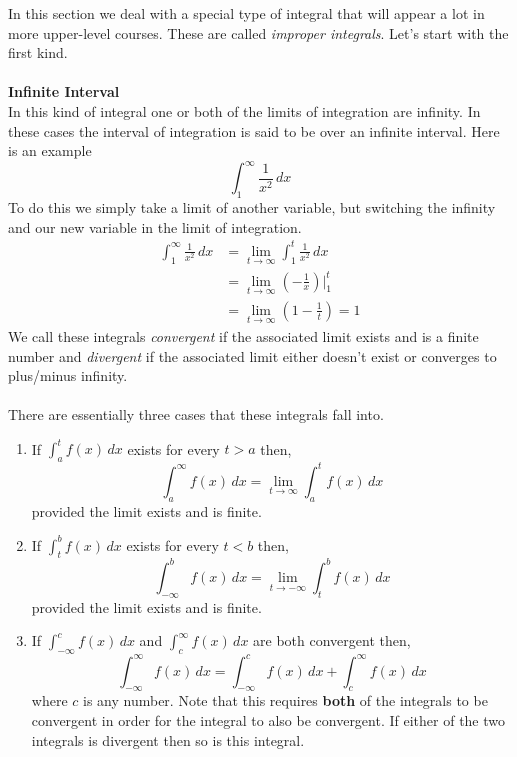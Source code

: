 \documentclass[10pt,reqno]{book}
\theoremstyle{definition}
\begin{document}
	In this section we deal with a special type of integral that will appear a lot in more upper-level courses. These are called \textit{improper integrals}. Let's start with the first kind.\\ \\
	\textbf{Infinite Interval}\\
	In this kind of integral one or both of the limits of integration are infinity. In these cases the interval of integration is said to be over an infinite interval. Here is an example 
	\[ \int_{1}^{\infty} \frac{1}{x^2}\,dx \]
	To do this we simply take a limit of another variable, but switching the infinity and our new variable in the limit of integration. 
	\begin{align*}
		\int_{1}^{\infty} \frac{1}{x^2}\,dx &= \lim\limits_{t \to \infty} \int_{1}^{t} \frac{1}{x^2}\,dx\\
		&= \lim\limits_{t \to \infty} \left( -\frac{1}{x} \right) \Bigg|_{1}^{t}\\
		&= \lim\limits_{t \to \infty} \left( 1 - \frac{1}{t} \right) = 1
	\end{align*}
	We call these integrals \textit{convergent} if the associated limit exists and is a finite number and \textit{divergent} if the associated limit either doesn't exist or converges to plus/minus infinity.\\ \\
	There are essentially three cases that these integrals fall into.
	\begin{enumerate}
		\item If $ \int_{a}^{t} f(x)\,dx $ exists for every $ t > a $ then,
			\[ \int_{a}^{\infty} f(x)\,dx = \lim\limits_{t \to \infty} \int_{a}^{t} f(x)\,dx \]
			provided the limit exists and is finite.
			
		\item If $ \int_{t}^{b} f(x)\,dx $ exists for every $ t < b $ then,
			\[ \int_{-\infty}^{b} f(x)\,dx = \lim\limits_{t \to -\infty} \int_{t}^{b} f(x)\,dx \]
			provided the limit exists and is finite.
			
		\item If $ \int_{-\infty}^{c} f(x)\,dx $ and $ \int_{c}^{\infty} f(x)\,dx $ are both convergent then,
			\[ \int_{-\infty}^{\infty} f(x)\,dx = \int_{-\infty}^{c} f(x)\,dx + \int_{c}^{\infty} f(x)\,dx \]
			where $ c $ is any number. Note that this requires \textbf{both} of the integrals to be convergent in order for the integral to also be convergent. If either of the two integrals is divergent then so is this integral.
 	\end{enumerate}
 
\end{document}
